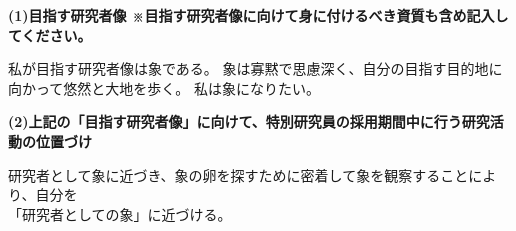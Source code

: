 \documentclass[11pt,a4j,dvipdfmx]{jarticle} 					%
\newcommand{\研究課題名}{象の卵}
\newcommand{\研究機関名}{逢坂大学}
\newcommand{\研究代表者氏名}{湯川秀樹}
\begin{document}
\noindent
\textbf{(1)目指す研究者像 {\scriptsize ※目指す研究者像に向けて身に付けるべき資質も含め記入してください。}}

私が目指す研究者像は象である。
象は寡黙で思慮深く、自分の目指す目的地に向かって悠然と大地を歩く。
私は象になりたい。

\vspace{5mm}
\noindent
\textbf{(2)上記の「目指す研究者像」に向けて、特別研究員の採用期間中に行う研究活動の位置づけ}

研究者として象に近づき、象の卵を探すために密着して象を観察することにより、自分を\\
「研究者としての象」に近づける。



\end{document}
